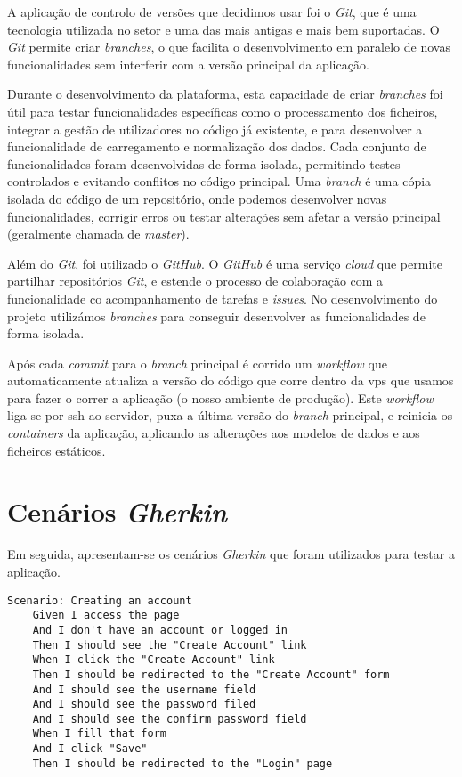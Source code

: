 A aplicação de controlo de versões que decidimos usar foi o \textit{Git}, que é uma tecnologia utilizada no setor e uma das mais antigas e mais bem suportadas. O \textit{Git} permite criar \textit{branches}, o que facilita o desenvolvimento em paralelo de novas funcionalidades sem interferir com a versão principal da aplicação.

Durante o desenvolvimento da plataforma, esta capacidade de criar \textit{branches} foi útil para testar funcionalidades específicas como o processamento dos ficheiros, integrar a gestão de utilizadores no código já existente, e para desenvolver a funcionalidade de carregamento e normalização dos dados. Cada conjunto de funcionalidades foram desenvolvidas de forma isolada, permitindo testes controlados e evitando conflitos no código principal. Uma \textit{branch} é uma cópia isolada do código de um repositório, onde podemos desenvolver novas funcionalidades, corrigir erros ou testar alterações sem afetar a versão principal (geralmente chamada de \textit{master}).

Além do \textit{Git}, foi utilizado o \textit{GitHub}. O \textit{GitHub} é uma serviço \textit{cloud} que permite partilhar repositórios \textit{Git}, e estende o processo de colaboração com a funcionalidade co acompanhamento de tarefas e \textit{issues}. No desenvolvimento do projeto utilizámos \textit{branches} para conseguir desenvolver as funcionalidades de forma isolada. 

Após cada \textit{commit} para o \textit{branch} principal é corrido um \textit{workflow} que automaticamente atualiza a versão do código que corre dentro da \gls{vps} que usamos para fazer o correr a aplicação (o nosso ambiente de produção). Este \textit{workflow} liga-se por \gls{ssh} ao servidor, puxa a última versão do \textit{branch} principal, e reinicia os \textit{containers} da aplicação, aplicando as alterações aos modelos de dados e aos ficheiros estáticos.

\chapter{Cenários \textit{Gherkin}}
\label{ch:cenariosGherkin}

Em seguida, apresentam-se os cenários \textit{Gherkin} que foram utilizados para testar a aplicação.

\begin{lstlisting}[language=Gherkin]
Scenario: Creating an account
    Given I access the page 
    And I don't have an account or logged in
    Then I should see the "Create Account" link
    When I click the "Create Account" link
    Then I should be redirected to the "Create Account" form
    And I should see the username field
    And I should see the password filed
    And I should see the confirm password field
    When I fill that form
    And I click "Save"
    Then I should be redirected to the "Login" page
\end{lstlisting}



